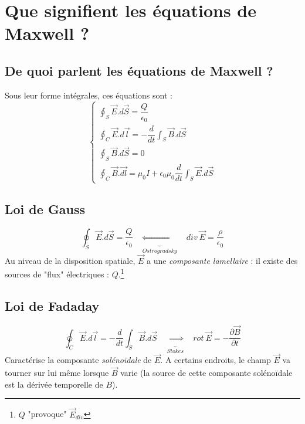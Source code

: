 \documentclass[11pt, a4paper, openany]{book}
\begin{document}
		
		
		\section{Que signifient les équations de Maxwell ?}
		\subsection{De quoi parlent les équations de Maxwell ?}
		Sous leur forme intégrales, ces équations sont :
		\begin{equation}
		\left\{\begin{array}{l}
		\oint_S \vec{E}.d\vec{S} = \dfrac{Q}{\epsilon_0}\\
		\oint_C \vec{E}.d\vec{l} = -\dfrac{d}{dt}\int_S \vec{B}.d\vec{S}\\
		\oint_S \vec{B}.d\vec{S} = 0\\
		\oint_C \vec{B}.\vec{dl} = \mu_0 I + \epsilon_0\mu_0\dfrac{d}{dt}\int_S \vec{E}.d\vec{S}
		\end{array}\right.
		\end{equation}
		
		\subsection{Loi de Gauss}
		\begin{equation}
		\oint_S \vec{E}.d\vec{S} = \frac{Q}{\epsilon_0}\ \ \ \ \underbrace{\Leftrightarrow}_{Ostrogradsky}\ \ \ \ div\ \vec{E} = \frac{\rho}{\epsilon_0}
		\end{equation}
		Au niveau de la disposition spatiale, $\vec{E}$ a une \textit{composante lamellaire} : il existe des sources de "flux" électriques : $Q$.\footnote{$Q$ "provoque" $\vec{E}_{div}$}\\
		
		\subsection{Loi de Fadaday}
		\begin{equation}
		\oint_C \vec{E}.d\vec{l} = -\dfrac{d}{dt}\int_S \vec{B}.d\vec{S}\ \ \ \ \underbrace{\Leftrightarrow}_{Stokes}\ \ \ \ rot\ \vec{E} = - \dfrac{\partial \vec{B}}{\partial t}
		\end{equation}
		Caractérise la composante \textit{solénoïdale} de $\vec{E}$. A certains endroits, le champ $\vec{E}$ va tourner sur lui même lorsque $\vec{B}$ varie (la source de cette composante solénoïdale est la dérivée temporelle de $B$).\\
		
\end{document}
